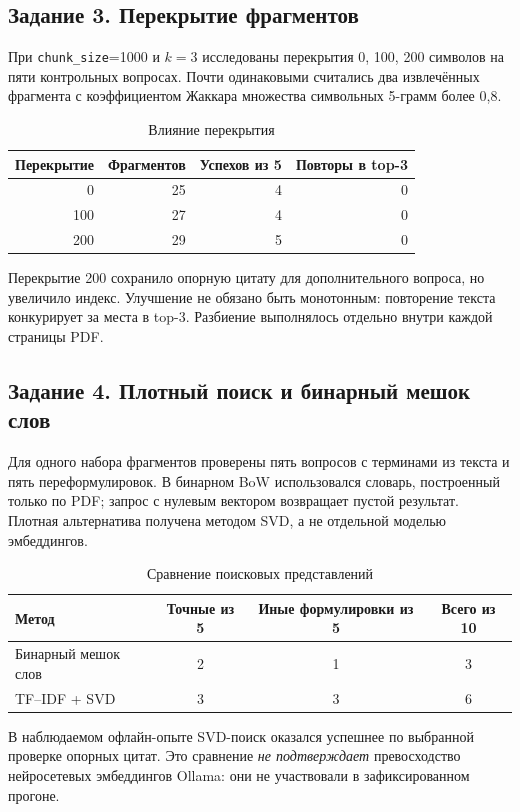 \documentclass[12pt,a4paper]{article}
\begin{document}
\subsection{Задание 3. Перекрытие фрагментов}
При \texttt{chunk\_size}=1000 и $k=3$ исследованы перекрытия 0, 100, 200 символов на пяти контрольных вопросах. Почти одинаковыми считались два извлечённых фрагмента с коэффициентом Жаккара множества символьных 5-грамм более 0,8.
\begin{table}[H]\centering\caption{Влияние перекрытия}\begin{tabular}{|r|r|r|r|}\hline
Перекрытие & Фрагментов & Успехов из 5 & Повторы в top-3 \\ \hline
0 & 25 & 4 & 0 \\ \hline
100 & 27 & 4 & 0 \\ \hline
200 & 29 & 5 & 0 \\ \hline
\end{tabular}\end{table}
Перекрытие 200 сохранило опорную цитату для дополнительного вопроса, но увеличило индекс. Улучшение не обязано быть монотонным: повторение текста конкурирует за места в top-3. Разбиение выполнялось отдельно внутри каждой страницы PDF.

\subsection{Задание 4. Плотный поиск и бинарный мешок слов}
Для одного набора фрагментов проверены пять вопросов с терминами из текста и пять переформулировок. В бинарном BoW использовался словарь, построенный только по PDF; запрос с нулевым вектором возвращает пустой результат. Плотная альтернатива получена методом SVD, а не отдельной моделью эмбеддингов.
\begin{table}[H]\centering\caption{Сравнение поисковых представлений}\begin{tabular}{|L{5.2cm}|c|c|c|}\hline
Метод & Точные из 5 & Иные формулировки из 5 & Всего из 10 \\ \hline
Бинарный мешок слов & 2 & 1 & 3 \\ \hline
TF--IDF + SVD & 3 & 3 & 6 \\ \hline
\end{tabular}\end{table}
В наблюдаемом офлайн-опыте SVD-поиск оказался успешнее по выбранной проверке опорных цитат. Это сравнение \emph{не подтверждает} превосходство нейросетевых эмбеддингов Ollama: они не участвовали в зафиксированном прогоне.
\end{document}
